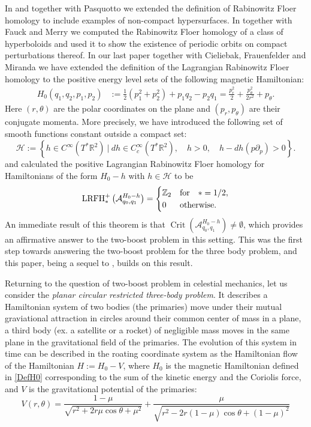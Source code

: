 \documentclass[a4paper]{amsart}
\numberwithin{equation}{section}
\newcommand{\R}{\mathbb{R}}
\newcommand{\A}{\mathcal{A}}
\newcommand{\LRFH}{{\rm LRFH}}
\newcommand{\Crit}{\operatorname{Crit}}
\begin{document}
In \cite{Pasquotto2017} and \cite{Pasquotto2018} together with Pasquotto we extended the definition of Rabinowitz Floer homology to include examples of non-compact hypersurfaces. In \cite{Fauck2021} together with Fauck and Merry we computed the Rabinowitz Floer homology of a class of hyperboloids and used it to show the existence of periodic orbits on compact perturbations thereof. In our last paper \cite{Wisniewska2024} together with Cieliebak, Frauenfelder and Miranda we have extended the definition of the Lagrangian Rabinowitz Floer homology to the positive energy level sets of the following magnetic Hamiltonian:
\begin{equation}\label{DefH0}
\begin{aligned}
H_0(q_1,q_2,p_1,p_2) & :=\frac{1}{2}(p_1^2+p_2^2)+ p_1q_2-p_2q_1 = \frac{p_r^2}{2}+\frac{p_\theta^2}{2r^2}+p_\theta.
\end{aligned}
\end{equation} 
Here $(r,\theta)$ are the polar coordinates on the plane and $(p_r,p_\theta)$ are their conjugate momenta. More precisely, we have introduced the following set of smooth functions constant outside a compact set:
\begin{equation}\label{DefHset}
\mathcal{H}:=\left\lbrace h\in C^\infty(T^*\R^2)\ \Big|\ dh\in C_c^\infty(T^*\R^2),\quad h>0,\quad h-dh(p\partial_p)> 0\right\rbrace.
\end{equation}
and calculated the positive Lagrangian Rabinowitz Floer homology for Hamiltonians of the form $H_0-h$ with $h\in\mathcal{H}$ to be
$$
\LRFH_*^+\left(\A^{H_0-h}_{q_0,q_1}\right)=
\begin{cases}
\mathbb{Z}_2 & \textrm{for}\quad *=1/2,\\
0 & \textrm{otherwise}.
\end{cases}
$$
An immediate result of this theorem \cite[Thm. 1.2]{Wisniewska2024} is that $\Crit (\A^{H_0-h}_{q_0,q_1})\neq \emptyset$, which provides an affirmative answer to the two-boost problem in this setting. This was the first step towards answering the two-boost problem for the three body problem, and this paper, being a sequel to \cite{Wisniewska2024}, builds on this result.  

Returning to the question of two-boost problem in celestial mechanics, let us consider the \emph{planar circular restricted three-body problem}. It describes a Hamiltonian system of two bodies (the primaries) move under their mutual graviational attraction in circles around their common center of mass in a plane, a third body (ex. a satellite or a rocket) of negligible mass moves in the same plane in the gravitational field of the primaries. The evolution of this system in time can be described in the roating coordinate system as the Hamiltonian flow of the Hamiltonian $H:=H_0-V$, where $H_0$ is the magnetic Hamiltonian defined in \eqref{DefH0} corresponding to the sum of the kinetic energy and the Coriolis force, and $V$ is the gravitational potential of the primaries:
\begin{equation}\label{3BDPotential}
V(r,\theta)=\frac{1-\mu}{\sqrt{r^2+2r\mu \cos \theta +\mu^2}}+\frac{\mu}{\sqrt{r^2-2r(1-\mu) \cos \theta +(1-\mu)^2}}
\end{equation}
\end{document}
